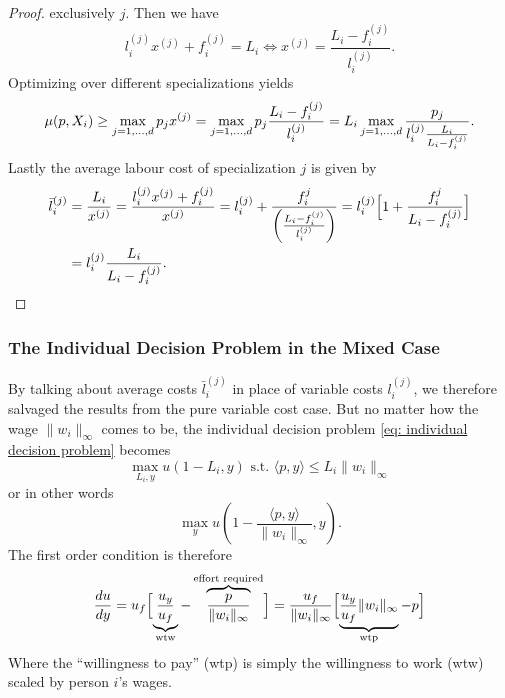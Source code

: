 \begin{proof}
	exclusively \(j\). Then we have
	\[
		l_i^{(j)} x^{(j)} + f_i^{(j)} = L_i \iff x^{(j)} = \frac{L_i-f_i^{(j)}}{l_i^{(j)}}.
	\]
	Optimizing over different specializations yields
	\[
		\mu(p, X_i) \ge \max_{j=1,\dots,d} p_j x^{(j)}
		= \max_{j=1,\dots,d}
		p_j \frac{L_i - f_i^{(j)}}{l_i^{(j)}}
		= L_i\max_{j=1,\dots,d}
		\frac{p_j}{l_i^{(j)}\frac{L_i}{L_i - f_i^{(j)}}}.
	\]
	Lastly the average labour cost of specialization \(j\) is given by
	\begin{align*}
		\bar{l}_i^{(j)}
		&= \frac{L_i}{x^{(j)}}
		= \frac{l_i^{(j)} x^{(j)} + f_i^{(j)}}{x^{(j)}}
		= l_i^{(j)} + \frac{f_i^{j}}{\left(\frac{L_i-f_i^{(j)}}{l_i^{(j)}}\right)}
		= l_i^{(j)} \Bigl[1 + \frac{f_i^{j}}{L_i-f_i^{(j)}}\Bigr]\\
		&=l_i^{(j)}\frac{L_i}{L_i - f_i^{(j)}}.
		\qedhere
	\end{align*}
\end{proof}

\subsubsection{The Individual Decision Problem in the Mixed Case}

By talking about average costs \(\bar{l}_i^{(j)}\) in place of variable costs
\(l_i^{(j)}\), we therefore salvaged the results from the pure variable
cost case. But no matter how the wage \(\|w_i\|_\infty\) comes to be, the
individual decision problem \eqref{eq: individual decision problem} becomes
\[
	\max_{L_i, y} u(1-L_i, y) \text{ s.t. } \langle p, y\rangle \le L_i \|w_i\|_\infty
\]
or in other words
\[
	\max_{y} u\left(1- \frac{\langle p, y\rangle}{\|w_i\|_\infty}, y\right).
\]
The first order condition is therefore
\[
	\frac{du}{dy} 
	= u_f\Bigl[
		\underbrace{\frac{u_y}{u_f}}_{\text{wtw}}
		- \overbrace{\frac{p}{\|w_i\|_\infty}}^{\text{effort required}}
	\Bigr]
	= \frac{u_f}{\|w_i\|_\infty}\Bigl[
		\underbrace{\frac{u_y}{u_f}\|w_i\|_\infty}_{\text{wtp}}
		- p
	\Bigr]
\]
Where the ``willingness to pay'' (wtp) is simply the willingness to work
(wtw) scaled by person \(i\)'s wages.

